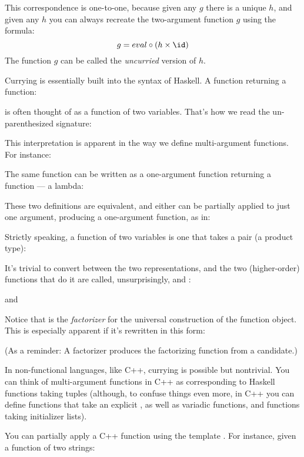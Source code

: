This correspondence is one-to-one, because given any $g$ there is
a unique $h$, and given any $h$ you can always recreate
the two-argument function $g$ using the formula:
\[g = eval \circ (h \times \id)\]
The function $g$ can be called the \emph{uncurried} version of $h$.

Currying is essentially built into the syntax of Haskell. A function
returning a function:

is often thought of as a function of two variables. That's how we read
the un-parenthesized signature:

This interpretation is apparent in the way we define multi-argument
functions. For instance:

The same function can be written as a one-argument function returning a
function --- a lambda:

These two definitions are equivalent, and either can be partially
applied to just one argument, producing a one-argument function, as in:

Strictly speaking, a function of two variables is one that takes a pair
(a product type):

It's trivial to convert between the two representations, and the two
(higher-order) functions that do it are called, unsurprisingly,
 and :

and

Notice that  is the \emph{factorizer} for the universal
construction of the function object. This is especially apparent if it's
rewritten in this form:

(As a reminder: A factorizer produces the factorizing function from a
candidate.)

In non-functional languages, like C++, currying is possible but
nontrivial. You can think of multi-argument functions in C++ as
corresponding to Haskell functions taking tuples (although, to confuse
things even more, in C++ you can define functions that take an explicit
, as well as variadic functions, and functions taking
initializer lists).

You can partially apply a C++ function using the template
. For instance, given a function of two strings:

